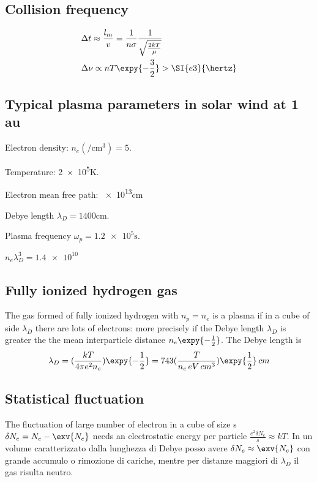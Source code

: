 \subsection{Collision frequency}

\begin{align*}
&\Delta t\approx\frac{l_m}{v}=\frac{1}{n\sigma}\frac{1}{\sqrt{\frac{2kT}{\mu}}}\\
&\Delta\nu\propto n T\expy{-\frac{3}{2}}>\SI{e3}{\hertz}
\end{align*}

\subsection{Typical plasma parameters in solar wind at 1 \si{\astronomicalunit}}

\begin{itemize*}
\item Electron density: $n_e(\si{\per\cubic\cm})=5$.
\item Temperature: \num{2e5}\si{\kelvin}.
\item Electron mean free path: \num{e13}\si{\cm}
\item Debye length $\lambda_D=\num{1400}\si{\cm}$.
\item Plasma frequency $\omega_p=\num{1.2e5}\si{\second}$.
\item $n_e\lambda_D^3=\num{1.4e10}$
\end{itemize*}


\subsection{Fully ionized hydrogen gas}

The gas formed of fully ionized hydrogen with $n_p=n_e$ is a plasma if in a cube of side $\lambda_D$ there are lots of electrons: more precisely if the Debye length $\lambda_D$ is greater the the mean interparticle distance $n_e\expy{-\frac{1}{2}}$. The Debye length is
\begin{equation*}
\lambda_D=(\frac{kT}{4\pi e^2n_e})\expy{-\frac{1}{2}}=743(\frac{T}{n_e\,eV\,cm^3})\expy{\frac{1}{2}}\,cm
\end{equation*}

\subsection{Statistical fluctuation}

The fluctuation of large number of electron in a cube of size s $\delta N_e=N_e-\exv{N_e}$ needs an electrostatic energy per particle $\frac{e^2\delta N_e}{s}\approx kT$. In un volume caratterizzato dalla lunghezza di Debye posso avere $\delta N_e\approx\exv{N_e}$ con grande accumulo o rimozione di cariche, mentre per distanze maggiori di $\lambda_D$ il gas risulta neutro.

